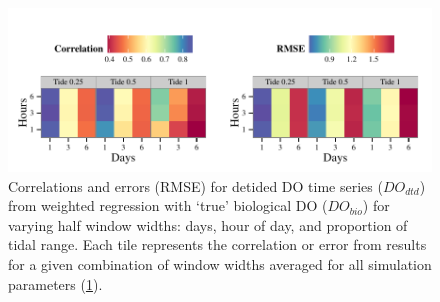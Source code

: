 \documentclass[letterpaper,12pt,oneside]{article}\usepackage[]{graphicx}\usepackage[]{color}
\makeatletter
\def\maxwidth{ %
  \ifdim\Gin@nat@width>\linewidth
    \linewidth
  \else
    \Gin@nat@width
  \fi
}
\newenvironment{knitrout}{}{} %
\makeatother
\begin{document}
\centering\vspace*{\fill}
\begin{knitrout}
\color{fgcolor}\begin{figure}[!ht]


{\centering \includegraphics[width=\maxwidth]{figure/err_surf2} 

}

\caption[Correlations and errors (\ac{RMSE}) for detided \ac{DO} time series ($DO_{dtd}$) from weighted regression with `true' biological \ac{DO} ($DO_{bio}$) for varying half window widths]{Correlations and errors (\ac{RMSE}) for detided \ac{DO} time series ($DO_{dtd}$) from weighted regression with `true' biological \ac{DO} ($DO_{bio}$) for varying half window widths: days, hour of day, and proportion of tidal range.  Each tile represents the correlation or error from results for a given combination of window widths averaged for all simulation parameters (\cref{fig:err_surf2}).\label{fig:err_surf2}}
\end{figure}


\end{knitrout}
\vfill
\clearpage
\end{document}
